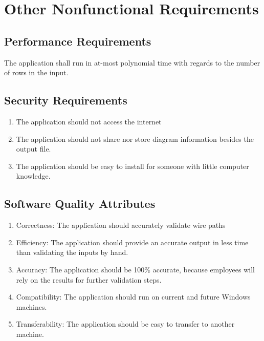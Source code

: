 \section{Other Nonfunctional Requirements}

\subsection{Performance Requirements}
The application shall run in at-most polynomial time with regards to the number of rows in the input.

\subsection{Security Requirements}
\begin{enumerate}
 \item The application should not access the internet
 \item The application should not share nor store diagram information besides the output file.
 \item The application should be easy to install for someone with little computer knowledge.
\end{enumerate}


\subsection{Software Quality Attributes}
\begin{enumerate}

 \item Correctness: The application should accurately validate wire paths
 \item Efficiency: The application should provide an accurate output in less time than validating the inputs by hand.
 \item Accuracy: The application should be 100\% accurate, because employees will rely on the results for further validation steps.
 \item Compatibility: The application should run on current and future Windows machines.
 \item Transferability: The application should be easy to transfer to another machine.

\end{enumerate}






